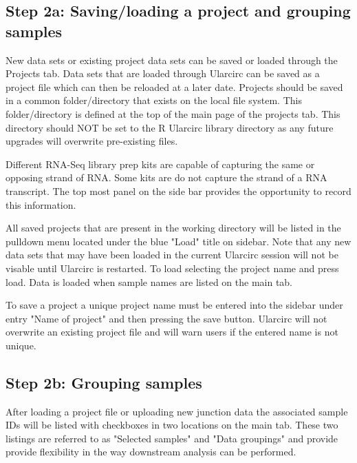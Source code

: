 \documentclass[12pt]{article}
\begin{document}
\subsection{Step 2a: Saving/loading a project and grouping samples} \label{sec:Step2}
\indent New data sets or existing project data sets can be saved or loaded through the Projects tab. Data sets that are loaded through Ularcirc can be saved as a project file which can then be reloaded at a later date. Projects should be saved in a common folder/directory that exists on the local file system. This folder/directory is defined at the top of the  main page of the projects tab. This directory should NOT be set to the R Ularcirc library  directory as any future upgrades will overwrite pre-existing files. \par

Different RNA-Seq library prep kits are capable of capturing the same or opposing strand of RNA. Some kits are do not capture the strand of a RNA transcript. The top most panel on the side bar provides the opportunity to record this information. \par

All saved projects that are present in the working directory will be listed in the pulldown menu located under the blue "Load" title on sidebar. Note that any new data sets that may have been loaded in the current Ularcirc session will not be visable until Ularcirc is restarted. To load selecting the project name and press load. Data is loaded when sample names are listed on the main tab. \par

To save a project a unique project name must be entered into the sidebar under entry "Name of project" and then pressing the save button. Ularcirc will not overwrite an existing project file and will warn users if the entered name is not unique.
\subsection{Step 2b: Grouping samples} \label{sec:Step2}

\indent After loading a project file or uploading new junction data the associated sample IDs will be listed with checkboxes in two locations on the main tab. These two listings are referred to as "Selected samples" and "Data groupings" and provide provide flexibility in the way downstream analysis can be performed. \par
\end{document}
